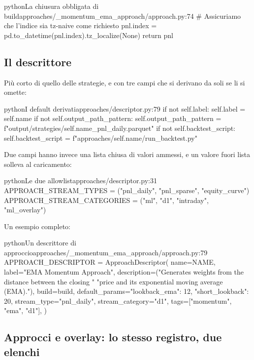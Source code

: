\begin{codiceInterno}{python}{La chiusura obbligata di build}{approaches/\_momentum\_ema\_approach/approach.py:74}
    # Assicuriamo che l'indice sia tz-naive come richiesto
    pnl.index = pd.to_datetime(pnl.index).tz_localize(None)
    return pnl
\end{codiceInterno}

\subsection{Il descrittore}

Più corto di quello delle strategie, e con tre campi che si derivano da soli
se li si omette:

\begin{codiceInterno}{python}{I default derivati}{approaches/descriptor.py:79}
        if not self.label:
            self.label = self.name
        if not self.output_path_pattern:
            self.output_path_pattern = f"output/strategies/{self.name}_pnl_daily.parquet"
        if not self.backtest_script:
            self.backtest_script = f"approaches/{self.name}/run_backtest.py"
\end{codiceInterno}

\noindent
Due campi hanno invece una lista chiusa di valori ammessi, e un valore fuori
lista solleva  al caricamento:

\begin{codiceInterno}{python}{Le due allowlist}{approaches/descriptor.py:31}
APPROACH_STREAM_TYPES = ("pnl_daily", "pnl_sparse", "equity_curve")
APPROACH_STREAM_CATEGORIES = ("ml", "d1", "intraday", "ml_overlay")
\end{codiceInterno}

\noindent
Un esempio completo:

\begin{codiceInterno}{python}{Un descrittore di approccio}{approaches/\_momentum\_ema\_approach/approach.py:79}
APPROACH_DESCRIPTOR = ApproachDescriptor(
    name=NAME,
    label="EMA Momentum Approach",
    description=("Generates weights from the distance between the closing "
                 "price and its exponential moving average (EMA)."),
    build=build,
    default_params={"lookback_ema": 12, "short_lookback": 20},
    stream_type="pnl_daily",
    stream_category="d1",
    tags=["momentum", "ema", "d1"],
)
\end{codiceInterno}

\subsection{Approcci e overlay: lo stesso registro, due elenchi}

